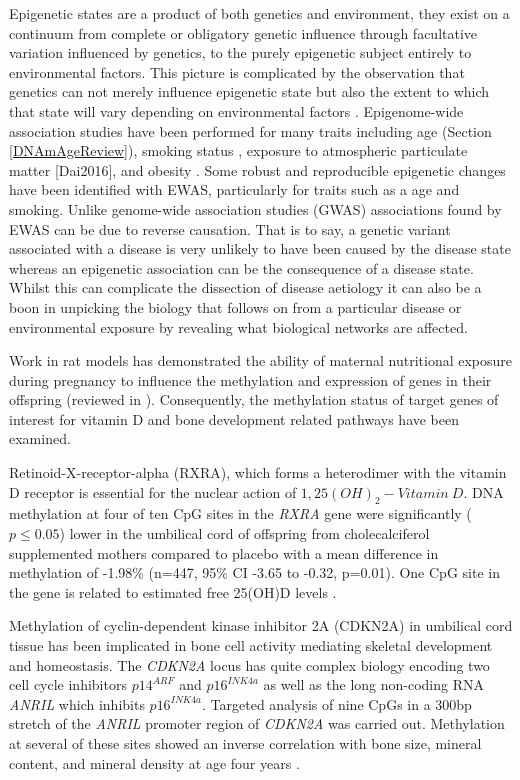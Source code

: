 \documentclass[
]{book}
\begin{document}
Epigenetic states are a product of both genetics and environment, they exist on a continuum from complete or obligatory genetic influence through facultative variation influenced by genetics, to the purely epigenetic subject entirely to environmental factors.
This picture is complicated by the observation that genetics can not merely influence epigenetic state but also the extent to which that state will vary depending on environmental factors \citep{Holland2017}.
Epigenome-wide association studies have been performed for many traits including age (Section \ref{DNAmAgeReview}), smoking status \citep{Dogan2017}, exposure to atmospheric particulate matter {[}Dai2016{]}, and obesity \citep{Wahl2016}.
Some robust and reproducible epigenetic changes have been identified with EWAS, particularly for traits such as a age and smoking.
Unlike genome-wide association studies (GWAS) associations found by EWAS can be due to reverse causation.
That is to say, a genetic variant associated with a disease is very unlikely to have been caused by the disease state whereas an epigenetic association can be the consequence of a disease state.
Whilst this can complicate the dissection of disease aetiology it can also be a boon in unpicking the biology that follows on from a particular disease or environmental exposure by revealing what biological networks are affected.

Work in rat models has demonstrated the ability of maternal nutritional exposure during pregnancy to influence the methylation and expression of genes in their offspring \citep{Burdge2007a, Lillycrop2008} (reviewed in \citep{Burdge2007}).
Consequently, the methylation status of target genes of interest for vitamin D and bone development related pathways have been examined.

Retinoid-X-receptor-alpha (RXRA), which forms a heterodimer with the vitamin D receptor is essential for the nuclear action of \(1,25(OH)_2-Vitamin~D\).
DNA methylation at four of ten CpG sites in the \emph{RXRA} gene were significantly (\(p\le0.05\)) lower in the umbilical cord of offspring from cholecalciferol supplemented mothers compared to placebo with a mean difference in methylation of -1.98\% (n=447, 95\% CI -3.65 to -0.32, p=0.01).
One CpG site in the gene is related to estimated free 25(OH)D levels \citep{Harvey2014d}.

Methylation of cyclin-dependent kinase inhibitor 2A (CDKN2A) in umbilical cord tissue has been implicated in bone cell activity mediating skeletal development and homeostasis.
The \emph{CDKN2A} locus has quite complex biology encoding two cell cycle inhibitors \(p14^{ARF}\) and \(p16^{INK4a}\) as well as the long non-coding RNA \emph{ANRIL} which inhibits \(p16^{INK4a}\).
Targeted analysis of nine CpGs in a 300bp stretch of the \emph{ANRIL} promoter region of \emph{CDKN2A} was carried out.
Methylation at several of these sites showed an inverse correlation with bone size, mineral content, and mineral density at age four years \citep{Curtis2017}.
\end{document}
